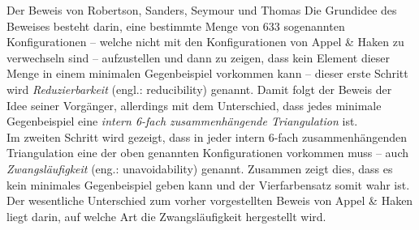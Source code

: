 \begin{chapter}{Der Beweis von Robertson, Sanders, Seymour und Thomas}
  Die Grundidee des Beweises besteht darin, eine bestimmte Menge von 633 sogenannten Konfigurationen -- welche nicht mit den Konfigurationen von Appel \& Haken zu verwechseln sind -- aufzustellen und dann zu zeigen, dass kein Element dieser Menge in einem minimalen Gegenbeispiel vorkommen kann -- dieser erste Schritt wird \textit{Reduzierbarkeit} (engl.: reducibility) genannt. Damit folgt der Beweis der Idee seiner Vorgänger, allerdings mit dem Unterschied, dass jedes minimale Gegenbeispiel eine \textit{intern 6-fach zusammenhängende Triangulation} ist. \\
  Im zweiten Schritt wird gezeigt, dass in jeder intern 6-fach zusammenhängenden Triangulation eine der oben genannten Konfigurationen vorkommen muss -- auch \textit{Zwangsläufigkeit} (eng.: unavoidability) genannt. Zusammen zeigt dies, dass es kein minimales Gegenbeispiel geben kann und der Vierfarbensatz somit wahr ist. \\
  Der wesentliche Unterschied zum vorher vorgestellten Beweis von Appel \& Haken liegt darin, auf welche Art die Zwangsläufigkeit hergestellt wird.
  
  
  
  
\end{chapter}
